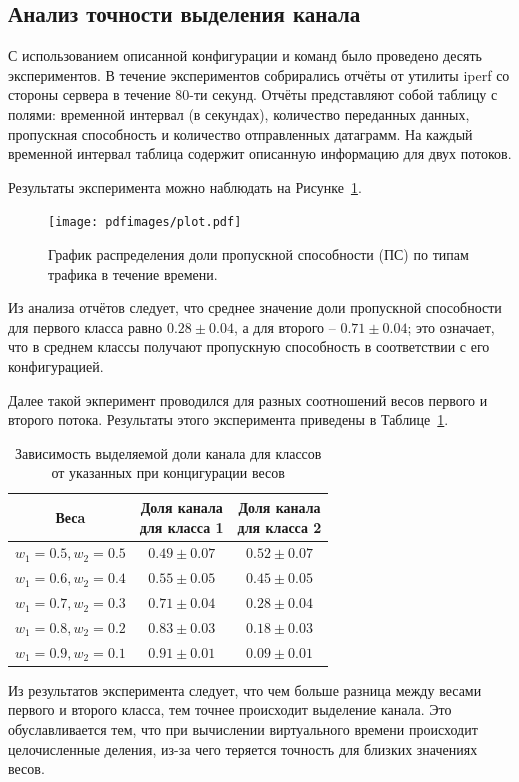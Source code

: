 		\subsection{Анализ точности выделения канала}

    		С использованием описанной конфигурации и команд было проведено десять экспериментов.
    		В течение экспериментов собрирались отчёты от утилиты iperf со стороны сервера в
    		течение 80-ти секунд. Отчёты представляют собой таблицу с полями:
			временной интервал (в секундах), количество переданных данных, пропускная способность
			и количество отправленных датаграмм. На каждый временной интервал таблица содержит
			описанную информацию для двух потоков.

			Результаты эксперимента можно наблюдать на Рисунке~\ref{pic:plot}.

            \begin{figure}[ht!]
            	\center
            	\texttt{[image: pdfimages/plot.pdf]}
            	\caption{График распределения доли пропускной способности (ПС) по типам трафика в течение времени.}
    			\label{pic:plot}
            \end{figure}
    		Из анализа отчётов следует, что среднее значение доли пропускной способности для первого
			класса равно $0.28 \pm 0.04$, а для второго -- $0.71 \pm 0.04$; это означает,
			что в среднем классы получают пропускную способность в соответствии с его конфигурацией.

			Далее такой экперимент проводился для разных соотношений весов первого и второго потока.
			Результаты этого эксперимента приведены в Таблице~\ref{tab:rateres}.
		
			\begin{table}[ht!]
				\center
				\begin{tabular}{|c|c|c|}
					\hline
					Весa & \mc{Доля канала\\  для класса 1} & \mc{Доля канала\\ для класса 2} \\ \hline
    				$w_1 = 0.5, w_2 = 0.5$ & $0.49 \pm 0.07$ & $0.52 \pm 0.07$\\ \hline
    				$w_1 = 0.6, w_2 = 0.4$ & $0.55 \pm 0.05$ & $0.45 \pm 0.05$\\ \hline
    				$w_1 = 0.7, w_2 = 0.3$ & $0.71 \pm 0.04$ & $0.28 \pm 0.04$\\ \hline
    				$w_1 = 0.8, w_2 = 0.2$ & $0.83 \pm 0.03$ & $0.18 \pm 0.03$\\ \hline
    				$w_1 = 0.9, w_2 = 0.1$ & $0.91 \pm 0.01$ & $0.09 \pm 0.01$\\ \hline
    				\end{tabular}
				\caption{Зависимость выделяемой доли канала для классов от указанных при концигурации весов }
				\label{tab:rateres}
			\end{table}

			Из результатов эксперимента следует, что чем больше разница между весами
			первого и второго класса, тем точнее происходит выделение канала. Это
			обуславливается тем, что при вычислении виртуального времени
			происходит целочисленные деления, из-за чего теряется точность
			для близких значениях весов.
			


